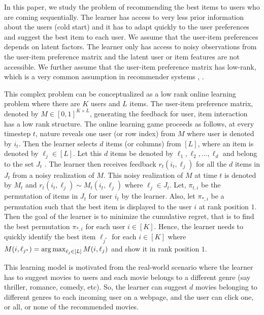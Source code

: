 In this paper, we study the problem of recommending the best items to users who are coming sequentially. The learner has access to very less prior information about the users (cold start) and it has to adapt quickly to the user preferences and suggest the best item to each user. We assume that the user-item preferences depends on latent factors. The learner only has access to noisy observations from the user-item preference matrix and the latent user or item features are not accessible. We further assume that the user-item preference matrix has low-rank, which is a very common assumption in recommender systems \citep{koren2009matrix}, \citep{ricci2011liorrokach}. %

	This complex problem can be conceptualized as a low rank online learning  problem where there are $K$ users and $L$ items. The user-item preference  matrix, denoted by $M\in [0,1]^{K\times L}$,  generating the feedback for user, item interaction has a low rank structure. The online learning game proceeds as follows, at every timestep $t$,  nature reveals one user (or row index) from $M$ where user is denoted by $i_t$. Then the learner selects $d$ items (or columns) from $[L]$, where an item is denoted by $\ell _{j}\in [L]$. Let this $d$ items be denoted by $ \ell_{1}, \ell_2, \dots, \ell_d$ and belong to the set $J_t$ . The learner then receives feedback $r_{t}(i_t,\ell_{j})$ for all the $d$ items in $J_t$ from a noisy realization of $M$. This noisy realization of $M$ at time $t$ is denoted by ${M}_t$ and  $r_{t}(i_t,\ell_{j}) \sim {M}_t(i_t,\ell_{j})$ where $\ell_j \in J_t$. Let, $\pi_{t, i}$ be the permutation of items in $J_t$ for user $i_t$ by the learner. Also, let $\pi_{*, i}$ be a permutation such  that the best item is  displayed to the user $i$ at rank position $1$. Then the goal of the learner is to minimize the cumulative regret, that is to find the best permutation $\pi_{*, i}$ for each user $i\in[K]$. Hence, the learner needs to quickly identify the best item $\ell_{j^*}$ for each $i\in [K]$ where $M(i,\ell_{j^*}) = \mathop{\rm arg\,max} _{\ell_j\in[L]} M(i,\ell_j)$ and show it in rank position $1$. 
	

	This learning model is motivated from the real-world scenario where the learner has  to suggest movies to users and each movie belongs to a different genre (say thriller, romance, comedy, etc). So, the learner can suggest $d$ movies belonging to different genres to each incoming user on a webpage, and the user can click one, or all, or none of the recommended movies. 
	
%	
	
